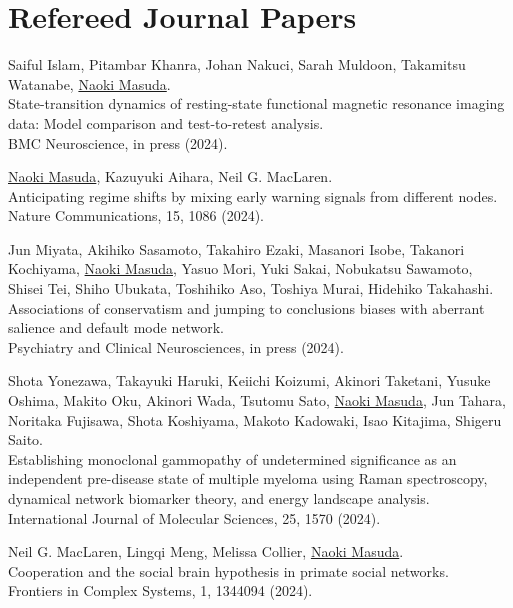 \documentclass[11pt,letter]{article}
\begin{document}

\section*{\bf \normalsize Refereed Journal Papers}

\begin{etaremune}

\item Saiful Islam, Pitambar Khanra, Johan Nakuci, Sarah Muldoon, Takamitsu Watanabe, \underline{Naoki Masuda}.\\
State-transition dynamics of resting-state functional magnetic resonance imaging data: Model comparison and test-to-retest analysis.\\
BMC Neuroscience, in press (2024).

\item \underline{Naoki Masuda}, Kazuyuki Aihara, Neil G. MacLaren.\\
Anticipating regime shifts by mixing early warning signals from different nodes.\\
Nature Communications, 15, 1086 (2024).

\item Jun Miyata, Akihiko Sasamoto, Takahiro Ezaki, Masanori Isobe, Takanori Kochiyama, \underline{Naoki Masuda}, Yasuo Mori, Yuki Sakai, Nobukatsu Sawamoto, Shisei Tei, Shiho Ubukata, Toshihiko Aso, Toshiya Murai, Hidehiko Takahashi.\\
Associations of conservatism and jumping to conclusions biases with aberrant salience and default mode network.\\
Psychiatry and Clinical Neurosciences, in press (2024).

\item Shota Yonezawa, Takayuki Haruki, Keiichi Koizumi, Akinori Taketani, Yusuke Oshima, Makito Oku, Akinori Wada, Tsutomu Sato, \underline{Naoki Masuda}, Jun Tahara, Noritaka Fujisawa, Shota Koshiyama, Makoto Kadowaki, Isao Kitajima, Shigeru Saito.\\
Establishing monoclonal gammopathy of undetermined significance as an independent pre-disease state of multiple myeloma using Raman spectroscopy, dynamical network biomarker theory, and energy landscape analysis.\\
International Journal of Molecular Sciences, 25, 1570 (2024).

\item Neil G. MacLaren, Lingqi Meng, Melissa Collier, \underline{Naoki Masuda}.\\
Cooperation and the social brain hypothesis in primate social networks.\\
Frontiers in Complex Systems, 1, 1344094 (2024).


\end{etaremune}
\end{document}
